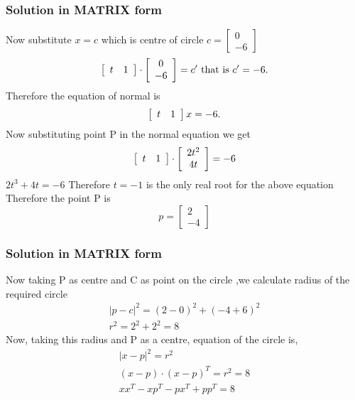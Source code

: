 \documentclass{beamer}
\begin{document}
\begin{frame}
\frametitle{Solution in MATRIX form}
Now substitute $x=c$ which is centre of circle  $c=\left[ 
  \begin{array}{ c  }
     0\\
    -6
  \end{array} \right]$
  \[
  \left[ 
  \begin{array}{ c c }
     t&1
  \end{array} \right]\cdot \left[ 
  \begin{array}{ c }
     0\\
    -6
  \end{array} \right]=c^{\prime}
  \text{ that is  }  c^{\prime}=-6.
  \]
  Therefore the equation of normal is
  \[\left[ 
  \begin{array}{ c c }
     t&1
  \end{array} \right]x=-6.
  \]
  Now substituting point P in the normal equation we get 
  \[
  \left[ 
  \begin{array}{ c c }
     t&1\\
  \end{array} \right]\cdot \left[ 
  \begin{array}{ c }
     2t^2\\
     4t
  \end{array} \right]=-6
  \]
   $2t^3+4t=-6$
Therefore $t=-1$ is the only real root for the above equation 
Therefore the point P is 
$$p=\left[ 
  \begin{array}{ c  }
     2\\
    -4
  \end{array} \right]
 $$

\end{frame}


\begin{frame}
\frametitle{Solution in MATRIX form}
Now taking P as centre and C as point on the circle ,we calculate radius of the required circle
\begin{gather*}
|p-c|^{2}=(2-0)^{2}+(-4+6)^{2} \\
r^2 = 2^{2} + 2^{2} = 8
\end{gather*}
Now, taking this radius and P as a centre, equation of the circle is,
\begin{gather*}
|x-p|^{2} = r^{2}\\
\left( x-p \right)\cdot (x-p)^{T} = r^{2} = 8\\
xx^{T} - xp^{T} - px^{T} + pp^{T} = 8
\end{gather*}
\end{frame}
\end{document}
